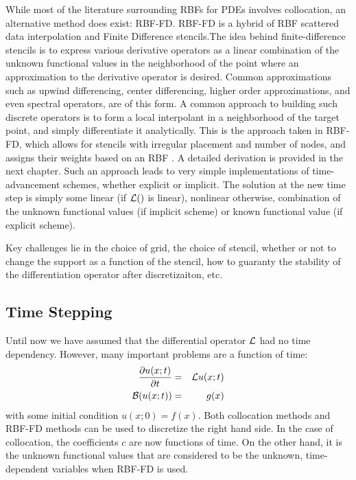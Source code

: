 \documentclass{report}
\begin{document}
{%
While most of the literature surrounding RBFs for PDEs involves collocation, an alternative method does exist: RBF-FD. RBF-FD is a hybrid of RBF scattered data interpolation and Finite Difference stencils.The idea behind finite-difference stencils is to express various derivative operators as a linear combination of the unknown functional values in the neighborhood of the point where an approximation to the derivative operator is desired. Common approximations such as upwind differencing, center differencing, higher order approximations, and even spectral operators, are of this form. A common approach to building such discrete operators is to form a local interpolant in a neighborhood of the target point, and simply differentiate it analytically. This is the approach taken in RBF-FD,   which  allows for stencils with irregular placement and number of nodes, and assigns their weights based on an RBF \cite{Wright2003}. 
A detailed derivation is provided in the next chapter. %
Such an approach leads to very simple implementations of time-advancement schemes, whether explicit or implicit. The solution at the new time step is simply some linear (if $\mathcal{L}()$ is linear), nonlinear otherwise, combination of the unknown functional values (if implicit scheme) or known functional value (if explicit scheme). 

Key challenges lie in the choice of grid, the choice of stencil, whether or not to change the support as a function of the stencil, how to guaranty the stability of the differentiation  operator after discretizaiton, etc. 


\subsection{Time Stepping}

Until now we have assumed that the differential operator $\mathcal{L}$ had no time dependency. However, many important problems are a function of time: 
\begin{eqnarray}
\frac{\partial u(x;t)}{\partial t} &=& \mathcal{L}u(x;t) \\
\mathcal{B}(u(x;t)) &=& g(x) 
\label{eqn:timedep}
\end{eqnarray}
with some initial condition $u(x;0) = f(x)$. Both collocation methods and RBF-FD methods can be used to discretize the right hand side. In the case of collocation, the coefficients $c$ are now functions of time. On the other hand, it is the unknown functional values that are considered to be the unknown, time-dependent variables when RBF-FD is used. 	

}
\end{document}
